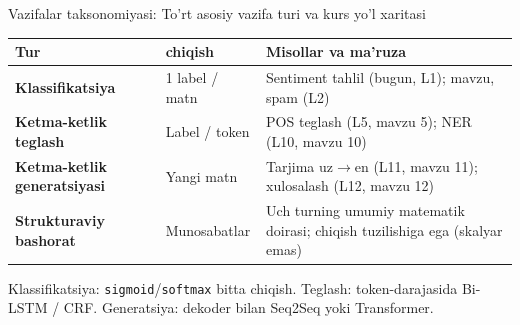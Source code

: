 \documentclass[aspectratio=169,11pt]{beamer}
\begin{document}
\begin{frame}{Vazifalar taksonomiyasi: To'rt asosiy vazifa turi va kurs yo'l xaritasi}
  \small
  \begin{tabular}{p{3.0cm}p{2.7cm}p{5.3cm}}
    \toprule
    \textbf{Tur} & \textbf{chiqish} & \textbf{Misollar va ma'ruza} \\
    \midrule
    \textbf{Klassifikatsiya} &
      1 label / matn &
      Sentiment tahlil (bugun, L1); mavzu, spam (L2) \\[4pt]
    \textbf{Ketma-ketlik teglash} &
      Label / token &
      POS teglash (L5, mavzu \textnumero{}5);
      NER (L10, mavzu \textnumero{}10) \\[4pt]
    \textbf{Ketma-ketlik generatsiyasi} &
      Yangi matn &
      Tarjima uz$\to$en (L11, mavzu \textnumero{}11);
      xulosalash (L12, mavzu \textnumero{}12) \\[4pt]
    \textbf{Strukturaviy bashorat} &
      Munosabatlar &
      Uch turning umumiy matematik doirasi;
      chiqish tuzilishiga ega (skalyar emas) \\
    \bottomrule
  \end{tabular}
  \vspace{5pt}
  \begin{tcolorbox}[okbox,title=Muhim!,top=2pt,bottom=2pt]
    \footnotesize
    Klassifikatsiya: \texttt{sigmoid}/\texttt{softmax} bitta chiqish.
    Teglash: token-darajasida Bi-LSTM / CRF.
    Generatsiya: dekoder bilan Seq2Seq yoki Transformer.
  \end{tcolorbox}
\end{frame}
\end{document}
